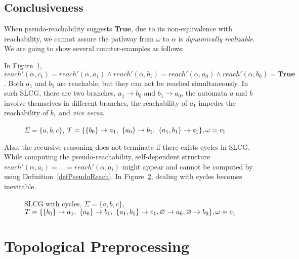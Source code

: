 \subsection{Conclusiveness}\label{sec:conclusiveness}

When pseudo-reachability suggests \textbf{True}, due to its non-equivalence with reachability, we cannot assure the pathway from $\omega$ to $\alpha$ is \textit{dynamically realizable}.
We are going to show several counter-examples as follows:

\begin{example}\label{example:unreach}
    In Figure~\ref{fig:limitation}, $reach'(\alpha,c_1)=reach'(\alpha,a_1)\land reach'(\alpha,b_1)=reach'(\alpha,a_0)\land reach'(\alpha,b_0)=\textbf{True}$. Both $a_1$ and $b_1$ are reachable, but they can not be reached simultaneously.
    In such SLCG, there are two branches, $a_1\to b_0$ and $b_1\to a_0$, the automata $a$ and $b$ involve themselves in different branches, the reachability of $a_1$ impedes the reachability of $b_1$ and \textit{vice versa}.
\end{example}

\begin{figure}[ht]
    \centering
    
    \caption[Limitation of SLCG 1]{$\Sigma=\{a,b,c\}$, $T=\{\acm{b_0}{a_0}{a_1},\ \acm{a_0}{b_0}{b_1},\ \acm{a_1,b_1}{c_0}{c_1}\},\omega=c_1$}
    \label{fig:limitation}
\end{figure}

Also, the recursive reasoning does not terminate if there exists cycles in SLCG. 
While computing the pseudo-reachability, self-dependent structure  $reach'(\alpha,a_i)=\ldots=reach'(\alpha,a_i)$ might appear and cannot be computed by using Definition~\ref{defPseudoReach}. 
In Figure~\ref{fig:limitation2}, dealing with cycles becomes inevitable.

\begin{figure}[ht]
    \centering
    
    \caption[Limitation of SLCG 2]{SLCG with cycles, $\Sigma=\{a,b,c\}$, $T=\{\acm{b_0}{a_0}{a_1},\ \acm{a_0}{b_0}{b_1},\ \acm{a_1,b_1}{c_0}{c_1},\varnothing \to a_0, \varnothing \to b_0\},\omega=c_1$}
    \label{fig:limitation2}
\end{figure}

\section{Topological Preprocessing}\label{sec:chap3preprocessing}

